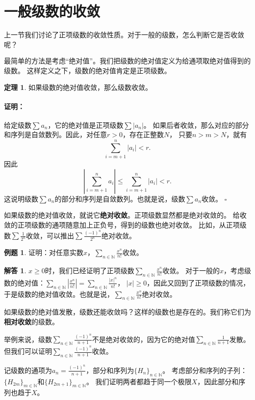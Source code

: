 \documentclass[12pt,UTF8]{ctexbook}
\theoremstyle{definition}
\newtheorem{tm}{定理}[section]
\newtheorem{et}{例题}[section]
\newtheorem*{so}{解答}
\theoremstyle{plain}
\renewenvironment{proof}{\paragraph{\textbf{证明：}}}{\hfill$\square$}
\begin{document}
\section{一般级数的收敛}
上一节我们讨论了正项级数的收敛性质。对于一般的级数，怎么判断它是否收敛呢？

最简单的方法是考虑“绝对值”。我们把级数的绝对值定义为给通项取绝对值得到的级数。
这样定义之下，级数的绝对值肯定是正项级数。

\begin{tm}
    如果级数的绝对值收敛，那么级数收敛。
\end{tm}

\begin{proof}
    给定级数$\sum a_n$，它的绝对值是正项级数$\sum |a_n|$。
    如果后者收敛，那么对应的部分和序列是自敛数列。因此，对任意$r>0$，存在正整数$N$，
    只要$n>m>N$，就有
    $$ \sum_{i=m+1}^n |a_i| < r. $$
    因此
    $$ \left|\sum_{i=m+1}^n a_i \right| \leqslant \sum_{i=m+1}^n |a_i| < r. $$
    这说明级数$\sum a_n$的部分和序列是自敛数列。也就是说，级数$\sum a_n$收敛。
\end{proof}

如果级数的绝对值收敛，就说它\textbf{绝对收敛}。正项级数显然都是绝对收敛的。
给收敛的正项级数的通项随意加上正负号，得到的级数也绝对收敛。
比如，从正项级数$\sum \frac{1}{2^n}$收敛，可以推出$\sum \frac{(-1)^{n}}{2^n}$绝对收敛。

\begin{et}
    证明：对任意实数$x$，$\sum_{n\in\mathbb{N}}\frac{x^{n}}{n!}$收敛。
\end{et}
\begin{so}
    $x\geqslant 0$时，我们已经证明了正项级数$\sum_{n\in\mathbb{N}}\frac{x^{n}}{n!}$收敛。
    对于一般的$x$，考虑级数的绝对值：$\sum_{n\in\mathbb{N}}\left|\frac{x^{n}}{n!}\right| = \sum_{n\in\mathbb{N}}\frac{|x|^{n}}{n!}$，
    $|x|\geqslant 0$，因此又回到了正项级数的情况，于是级数的绝对值收敛。也就是说，$\sum_{n\in\mathbb{N}}\frac{x^{n}}{n!}$绝对收敛。
\end{so}

如果级数的绝对值发散，级数还能收敛吗？这样的级数也是存在的。我们称它们为\textbf{相对收敛}的级数。

举例来说，级数$\sum_{n\in\mathbb{N}} \frac{(-1)^{n}}{n+1}$不是绝对收敛的，因为它的绝对值$\sum_{n\in\mathbb{N}} \frac{1}{n+1}$发散。
但我们可以证明$\sum_{n\in\mathbb{N}} \frac{(-1)^{n}}{n+1}$收敛。

记级数的通项为$a_n = \frac{(-1)^{n}}{n+1}$，部分和序列为$\{H_{n}\}_{n\in\mathbb{N}}$。
考虑部分和序列的子列：$\{H_{2m}\}_{m\in\mathbb{N}}$和$\{H_{2m+1}\}_{m\in\mathbb{N}}$。
我们证明两者都趋于同一个极限$X$，因此部分和序列也趋于$X$。
\end{document}

